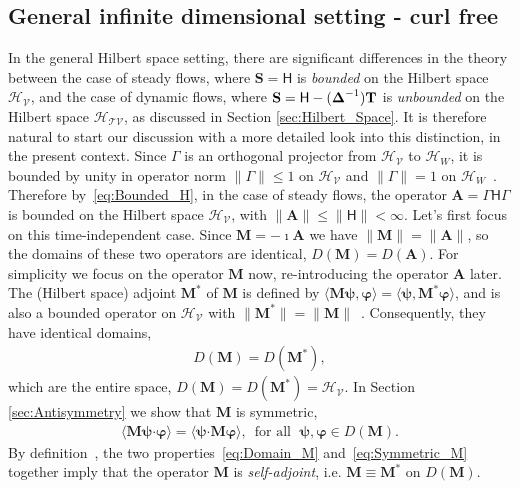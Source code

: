 \documentclass[leqno,onefignum,onetabnum]{siamltex1213}
\newcommand{\Mb}{\mathbf{M}}
\newcommand{\Tb}{\mathbf{T}}
\newcommand{\Sb}{\mathbf{S}}
\newcommand{\Ab}{\mathbf{A}}
\newcommand{\Tc}{\mathcal{T}}
\newcommand{\Vc}{\mathcal{V}}
\newcommand{\Hc}{\mathcal{H}}
\newcommand{\Hm}{\mathsf{H}}
\newcommand\bDelta{\mbox{\boldmath${\Delta}$}}
\providecommand\bcdot{\boldsymbol{\cdot}}
\newcommand{\vecpsi}{\boldsymbol{\psi}}
\newcommand{\vecvarphi}{\boldsymbol{\varphi}}
\begin{document}
\subsection{General infinite dimensional setting - curl free}
\label{sec:Integral_Rep_General_curl_free}
%
In the general Hilbert space setting, there are significant
differences in the theory between the case of steady flows, where
$\Sb=\Hm$ is \emph{bounded} on the Hilbert space $\Hc_{\Vc}$, and
the case of dynamic flows, where $\Sb=\Hm-(\bDelta^{-1})\Tb$ is
\emph{unbounded} on the Hilbert space $\Hc_{\Tc\Vc}$, as discussed in
Section \ref{sec:Hilbert_Space}. It is therefore natural to start our
discussion with a more detailed look into this distinction, in the
present context. Since $\Gamma$ is an orthogonal projector from
$\Hc_{\Vc}$ to $\Hc_W$, it is bounded by unity in operator norm
$\|\Gamma\|\leq1$ on $\Hc_{\Vc}$ and $\|\Gamma\|=1$ on
$\Hc_W$~\cite{Reed-1980,Stone:64}. Therefore by~\eqref{eq:Bounded_H},
in the 
case of  steady flows, the operator $\Ab=\Gamma\Hm\Gamma$ is bounded
on the Hilbert space $\Hc_{\Vc}$, with $\|\Ab\|\leq\|\Hm\|<\infty$. Let's first
focus on this time-independent case. Since $\Mb=-\imath\Ab$ we have 
$\|\Mb\|=\|\Ab\|$, so the domains of these two operators are identical,
$D(\Mb)=D(\Ab)$. For simplicity we focus on the operator $\Mb$ now,
re-introducing the operator $\Ab$ later. The (Hilbert space)
adjoint $\Mb^*$ of $\Mb$ is defined by
$\langle\Mb\vecpsi,\vecvarphi\rangle=\langle\vecpsi,\Mb^*\vecvarphi\rangle$, and is also a
bounded operator on $\Hc_{\Vc}$ with
$\|\Mb^*\|=\|\Mb\|$~\cite{Reed-1980}. Consequently, they have identical
domains,        
%
\begin{align}%
  D(\Mb)=D(\Mb^*),
\end{align}
%
which are the entire space, $D(\Mb)=D(\Mb^*)=\Hc_{\Vc}$. In
Section \ref{sec:Antisymmetry} we show that $\Mb$ is symmetric,
%
\begin{align}%
  \langle\Mb\vecpsi\bcdot\vecvarphi\rangle=\langle\vecpsi\bcdot\Mb\vecvarphi\rangle,
  \, \text{ for all } \; \vecpsi,\vecvarphi\in D(\Mb).
\end{align}
%
By definition~\cite{Reed-1980,Stone:64}, the two
properties~\eqref{eq:Domain_M} and~\eqref{eq:Symmetric_M} together
imply that the operator $\Mb$ is \emph{self-adjoint}, i.e. $\Mb\equiv\Mb^*$
on $D(\Mb)$. 
\end{document}
